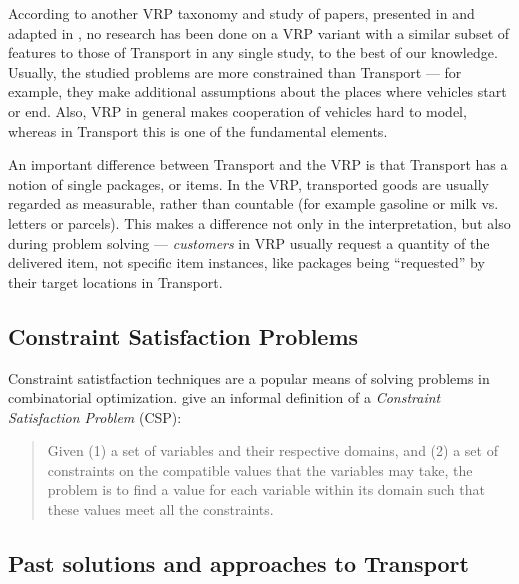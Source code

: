 According to another VRP taxonomy and study of papers, presented in \citet{Eksioglu2009} and adapted in \citet{Braekers2016}, no research has been done on a VRP variant with a similar subset of features to those of Transport in any single study, to the best of our knowledge.
Usually, the studied problems are more constrained than Transport --- for example, they make additional assumptions about the places where vehicles start or end. Also, VRP in general
makes cooperation of vehicles hard to model, whereas in Transport this is one of the fundamental elements.


An important difference between Transport and the VRP is that Transport has a notion of single packages, or items. In the VRP, transported goods are usually regarded as measurable, rather than countable (for example gasoline or milk vs. letters or parcels). This makes a difference not only in the
interpretation, but also during problem solving --- \textit{customers} in VRP usually request
a quantity of the delivered item, not specific item instances, like packages being ``requested''
by their target locations in Transport.

\subsection{Constraint Satisfaction Problems}\label{csp}

Constraint satistfaction techniques are a popular means of solving problems in combinatorial optimization. \citet[Section~8.1]{Ghallab2004} give an informal definition of a \textit{Constraint Satisfaction
Problem} (CSP):

\begin{quote}
Given (1) a set of variables and their respective domains, and (2) a set of constraints on the compatible values that the variables may take, the problem is to find a value for each variable within its domain such that these values meet all the constraints.
\end{quote}




\subsection{Past solutions and approaches to Transport}

